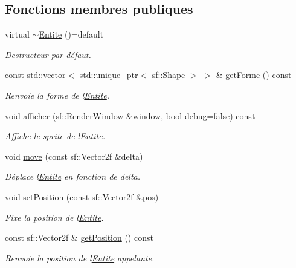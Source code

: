 \subsection*{Fonctions membres publiques}
\begin{DoxyCompactItemize}
\item 
virtual \hyperlink{class_entite_a8084762a25afbfbcdca31121a3dfcd87}{$\sim$\+Entite} ()=default
\begin{DoxyCompactList}\small\item\em Destructeur par défaut. \end{DoxyCompactList}\item 
const std\+::vector$<$ std\+::unique\+\_\+ptr$<$ sf\+::\+Shape $>$ $>$ \& \hyperlink{class_entite_ad7314f276ea1808e98cfd8b7d0e900c8}{get\+Forme} () const
\begin{DoxyCompactList}\small\item\em Renvoie la forme de l\textquotesingle{}\hyperlink{class_entite}{Entite}. \end{DoxyCompactList}\item 
void \hyperlink{class_entite_a91874d7e87f6cb479a3893fbedc6a4e3}{afficher} (sf\+::\+Render\+Window \&window, bool debug=false) const
\begin{DoxyCompactList}\small\item\em Affiche le sprite de l\textquotesingle{}\hyperlink{class_entite}{Entite}. \end{DoxyCompactList}\item 
void \hyperlink{class_entite_ac409613f3cf67cae14babd4b16811c8f}{move} (const sf\+::\+Vector2f \&delta)
\begin{DoxyCompactList}\small\item\em Déplace l\textquotesingle{}\hyperlink{class_entite}{Entite} en fonction de {\itshape delta}. \end{DoxyCompactList}\item 
void \hyperlink{class_entite_aa7fe4a7ebd8eb4c80ef9fdb7d97f2dad}{set\+Position} (const sf\+::\+Vector2f \&pos)
\begin{DoxyCompactList}\small\item\em Fixe la position de l\textquotesingle{}\hyperlink{class_entite}{Entite}. \end{DoxyCompactList}\item 
const sf\+::\+Vector2f \& \hyperlink{class_entite_a6f6fd1e1f9f6ad44f0ecc74961a774d9}{get\+Position} () const
\begin{DoxyCompactList}\small\item\em Renvoie la position de l\textquotesingle{}\hyperlink{class_entite}{Entite} appelante. \end{DoxyCompactList}\item 

\end{DoxyCompactItemize}
